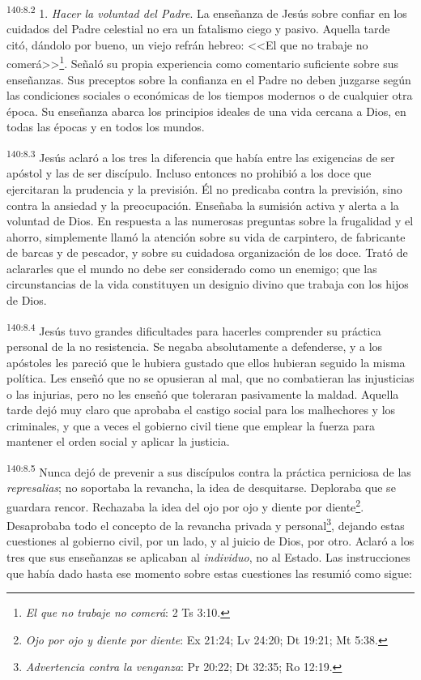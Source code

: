 \par 
\textsuperscript{140:8.2} 1. \textit{Hacer la voluntad del Padre}. La enseñanza de Jesús sobre confiar en los cuidados del Padre celestial no era un fatalismo ciego y pasivo. Aquella tarde citó, dándolo por bueno, un viejo refrán hebreo: <<El que no trabaje no comerá>>\footnote{\textit{El que no trabaje no comerá}: 2 Ts 3:10.}. Señaló su propia experiencia como comentario suficiente sobre sus enseñanzas. Sus preceptos sobre la confianza en el Padre no deben juzgarse según las condiciones sociales o económicas de los tiempos modernos o de cualquier otra época. Su enseñanza abarca los principios ideales de una vida cercana a Dios, en todas las épocas y en todos los mundos.

\par 
\textsuperscript{140:8.3} Jesús aclaró a los tres la diferencia que había entre las exigencias de ser apóstol y las de ser discípulo. Incluso entonces no prohibió a los doce que ejercitaran la prudencia y la previsión. Él no predicaba contra la previsión, sino contra la ansiedad y la preocupación. Enseñaba la sumisión activa y alerta a la voluntad de Dios. En respuesta a las numerosas preguntas sobre la frugalidad y el ahorro, simplemente llamó la atención sobre su vida de carpintero, de fabricante de barcas y de pescador, y sobre su cuidadosa organización de los doce. Trató de aclararles que el mundo no debe ser considerado como un enemigo; que las circunstancias de la vida constituyen un designio divino que trabaja con los hijos de Dios.

\par 
\textsuperscript{140:8.4} Jesús tuvo grandes dificultades para hacerles comprender su práctica personal de la no resistencia. Se negaba absolutamente a defenderse, y a los apóstoles les pareció que le hubiera gustado que ellos hubieran seguido la misma política. Les enseñó que no se opusieran al mal, que no combatieran las injusticias o las injurias, pero no les enseñó que toleraran pasivamente la maldad. Aquella tarde dejó muy claro que aprobaba el castigo social para los malhechores y los criminales, y que a veces el gobierno civil tiene que emplear la fuerza para mantener el orden social y aplicar la justicia.

\par 
\textsuperscript{140:8.5} Nunca dejó de prevenir a sus discípulos contra la práctica perniciosa de las \textit{represalias}; no soportaba la revancha, la idea de desquitarse. Deploraba que se guardara rencor. Rechazaba la idea del ojo por ojo y diente por diente\footnote{\textit{Ojo por ojo y diente por diente}: Ex 21:24; Lv 24:20; Dt 19:21; Mt 5:38.}. Desaprobaba todo el concepto de la revancha privada y personal\footnote{\textit{Advertencia contra la venganza}: Pr 20:22; Dt 32:35; Ro 12:19.}, dejando estas cuestiones al gobierno civil, por un lado, y al juicio de Dios, por otro. Aclaró a los tres que sus enseñanzas se aplicaban al \textit{individuo}, no al Estado. Las instrucciones que había dado hasta ese momento sobre estas cuestiones las resumió como sigue:

